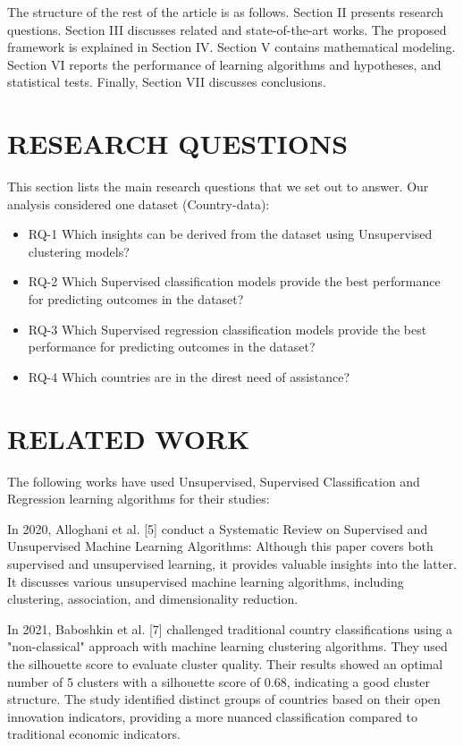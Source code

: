 \documentclass{article}
\begin{document}
\begin{multicols}{2}
The structure of the rest of the article is as follows. Section II presents research questions. Section III discusses related and state-of-the-art works. The proposed framework is explained in Section IV. Section V contains mathematical modeling. Section VI reports the performance of learning algorithms and hypotheses, and statistical tests. Finally, Section VII discusses conclusions.

\section{RESEARCH QUESTIONS}
This section lists the main research questions that we set out to answer. Our analysis considered one dataset (Country-data):
\begin{itemize}
    \item RQ-1 Which insights can be derived from the dataset using Unsupervised clustering models?
    \item RQ-2 Which Supervised classification models provide the best performance for predicting outcomes in the dataset?
    \item RQ-3 Which Supervised regression classification models provide the best performance for predicting outcomes in the dataset?
    \item RQ-4 Which countries are in the direst need of assistance?
\end{itemize}

\section{RELATED WORK}
The following works have used Unsupervised, Supervised Classification and Regression learning algorithms for their studies:

In 2020, Alloghani et al. [5] conduct a Systematic Review on Supervised and Unsupervised Machine Learning Algorithms: Although this paper covers both supervised and unsupervised learning, it provides valuable insights into the latter. It discusses various unsupervised machine learning algorithms, including clustering, association, and dimensionality reduction.

In 2021, Baboshkin et al. [7] challenged traditional country classifications using a "non-classical" approach with machine learning clustering algorithms. They used the silhouette score to evaluate cluster quality. Their results showed an optimal number of 5 clusters with a silhouette score of 0.68, indicating a good cluster structure. The study identified distinct groups of countries based on their open innovation indicators, providing a more nuanced classification compared to traditional economic indicators.


\end{multicols}
\end{document}
